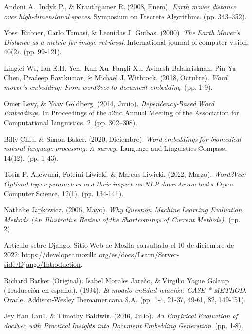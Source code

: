 \documentclass[12pt,a4paper]{article}
\begin{document}
\begin{sloppypar}
\begin{thebibliography}{9}
Andoni A., Indyk P., \& Krauthgamer R. (2008, Enero). \textit{Earth mover distance over high-dimensional spaces}. Symposium on Discrete Algorithms. (pp. 343–352).

Yossi Rubner, Carlo Tomasi, \& Leonidas J. Guibas. (2000). \textit{The Earth Mover’s Distance as a metric for image retrieval}. International journal of computer vision. 40(2). (pp. 99-121).

Lingfei Wu, Ian E.H. Yen, Kun Xu, Fangli Xu, Avinash Balakrishnan, Pin-Yu Chen, Pradeep Ravikumar, \& Michael J. Witbrock. (2018, Octubre). \textit{Word mover’s embedding: From word2vec to document embedding}. (pp. 1-9).

Omer Levy, \& Yoav Goldberg. (2014, Junio). \textit{Dependency-Based Word Embeddings}. In Proceedings of the 52nd Annual Meeting of the Association for Computational Linguistics. 2. (pp. 302–308).

Billy Chiu, \& Simon Baker. (2020, Diciembre). \textit{Word embeddings for biomedical natural language processing: A survey}. Language and Linguistics Compass. 14(12). (pp. 1-43).

Tosin P. Adewumi, Foteini Liwicki, \& Marcus Liwicki. (2022, Marzo). \textit{Word2Vec: Optimal hyper-parameters and their impact on NLP downstream tasks}. Open Computer Science. 12(1). (pp. 134-141).

Nathalie Japkowicz. (2006, Mayo). \textit{Why Question Machine Learning Evaluation Methods (An Illustrative Review of the Shortcomings of Current Methods)}. (pp. 2).

Artículo sobre Django. Sitio Web de Mozila consultado el 10 de diciembre de 2022: \url{https://developer.mozilla.org/es/docs/Learn/Server-side/Django/Introduction}.

Richard Barker (Original). Isabel Morales Jareño, \& Virgilio Yague Galaup (Traducción en español). (1994). \textit{El modelo entidad-relación: CASE * METHOD}. Oracle. Addison-Wesley Iberoamericana S.A. (pp. 1-4, 21-37, 49-61, 82, 149-151). 

Jey Han Lau1, \& Timothy Baldwin. (2016, Julio). \textit{An Empirical Evaluation of doc2vec with Practical Insights into Document Embedding Generation}. (pp. 1-8). 

\end{thebibliography}

\end{sloppypar}
\end{document}
